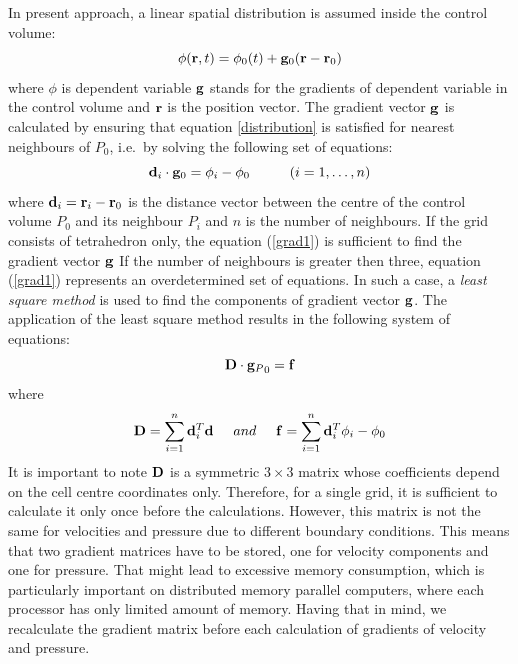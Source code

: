 \documentclass[10pt]{article}
\begin{document}
    In present approach, a linear spatial distribution is assumed
    inside the control volume:
    \begin{equation}  
    \phi({\bf r},t) = 
      \phi_0(t) + 
      {\bf g}_0 ({\bf r} - {\bf r}_0)
      \label{distribution} 
    \end{equation}
    where $\phi$ is dependent variable ${\bf g}$ stands for the
    gradients of dependent variable in the control volume and
    ${\bf r}$ is the position vector.  The gradient vector ${\bf g}$
    is calculated by ensuring that equation \ref{distribution}
    is satisfied for nearest neighbours of $P_0$, i.e.\ by solving
    the following set of equations:
    \begin{equation}  
    {\bf d}_i \cdot {\bf g}_0 = \phi_i - {\phi}_0
    \hspace{1cm} 
    (i=1,\dots,n)
    \label{grad1} 
    \end{equation}
    where ${\bf d}_i = {\bf r}_i - {\bf r}_0$ is the distance
    vector between the centre of the control volume $P_0$ and
    its neighbour $P_i$ and $n$ is the number of neighbours.
    If the grid consists of tetrahedron only, the equation 
    (\ref{grad1}) is sufficient to find the gradient vector ${\bf g}$ 
    If the number of neighbours is greater then three, equation
    (\ref{grad1}) represents an overdetermined set of equations.
    In such a case, a {\em least square method} is used to find
    the components of gradient vector ${\bf g}$. The application 
    of the least square method results in the following system
    of equations:
    \begin{equation} 
    {\bf D} \cdot {{\bf g}_P}_0 = {\bf f}
    \label{grad2} 
    \end{equation}
    where 
    \begin{equation}  
    {\bf D} = \sum_{i=1}^{n} {\bf d}_i^T{\bf d}
    \hspace{0.5cm}
    and 
    \hspace{0.5cm} 
    {\bf f} = \sum_{i=1}^{n} {\bf d}_i^T{\phi_i - \phi_0}
    \label{grad3} 
    \end{equation}
    It is important to note ${\bf D}$ is a symmetric $3 \times 3$
    matrix whose coefficients depend on the cell centre coordinates
    only. Therefore, for a single grid, it is sufficient to calculate
    it only once before the calculations. However, this matrix is
    not the same for velocities and pressure due to different boundary
    conditions. This means that two
    gradient matrices have to be stored, one for velocity components
    and one for pressure. That might lead to excessive memory 
    consumption, which is particularly important on distributed 
    memory parallel computers, where each processor has only 
    limited amount of memory. Having that in mind, we recalculate
    the gradient matrix before each calculation of gradients of
    velocity and pressure. 
        
\end{document}
